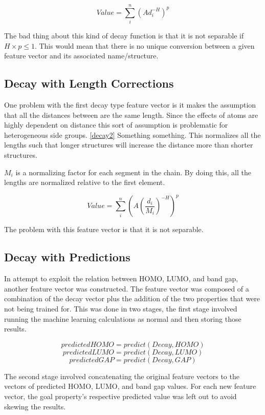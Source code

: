\documentclass[10pt]{article}
\begin{document}
\begin{equation}\label{decay}
    Value = \sum_i^n (A d_i^{-H})^{p}
\end{equation}

The bad thing about this kind of decay function is that it is not separable if $H \times p \le 1$. This would mean that there is no unique conversion between a given feature vector and its associated name/structure.


\subsection{Decay with Length Corrections}

One problem with the first decay type feature vector is it makes the assumption that all the distances between are the same length. Since the effects of atoms are highly dependent on distance this sort of assumption is problematic for heterogeneous side groups. \eqref{decay2} Something something. This normalizes all the lengths such that longer structures will increase the distance more than shorter structures.

$M_i$ is a normalizing factor for each segment in the chain. By doing this, all the lengths are normalized relative to the first element.

\begin{equation}\label{decay2}
    Value = \sum_i^n \left(A \left(\frac{d_i}{M_i}\right)^{-H} \right)^{p}
\end{equation}

The problem with this feature vector is that it is not separable.

\subsection{Decay with Predictions}

In attempt to exploit the relation between HOMO, LUMO, and band gap, another feature vector was constructed. The feature vector was composed of a combination of the decay vector plus the addition of the two properties that were not being trained for. This was done in two stages, the first stage involved running the machine learning calculations as normal and then storing those results.

$$ predictedHOMO = predict(Decay, HOMO) $$
$$ predictedLUMO = predict(Decay, LUMO) $$
$$ predictedGAP = predict(Decay, GAP) $$

The second stage involved concatenating the original feature vectors to the vectors of predicted HOMO, LUMO, and band gap values. For each new feature vector, the goal property's respective predicted value was left out to avoid skewing the results.
\end{document}
